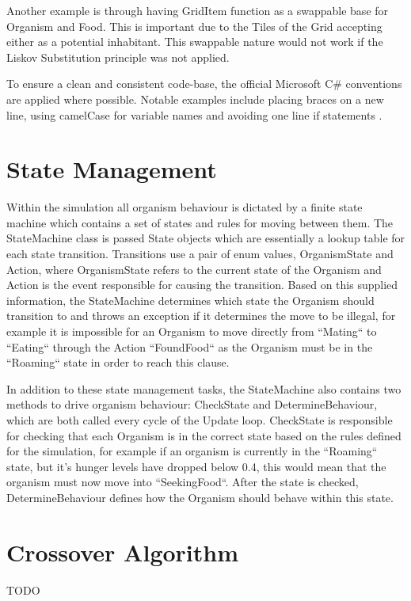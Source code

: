 \documentclass[a4paper, oneside, 11pt]{report}
\begin{document}
Another example is through having GridItem function as a swappable base for Organism and Food. This is important due to the Tiles of the Grid accepting either as a potential inhabitant. This swappable nature would not work if the Liskov Substitution principle was not applied.

To ensure a clean and consistent code-base, the official Microsoft C\# conventions are applied where possible. Notable examples include placing braces on a new line, using camelCase for variable names and avoiding one line if statements \cite{microsoft}.

\section{State Management}\label{statemanagement}
Within the simulation all organism behaviour is dictated by a finite state machine which contains a set of states and rules for moving between them. The StateMachine class is passed State objects which are essentially a lookup table for each state transition. Transitions use a pair of enum values, OrganismState and Action, where OrganismState refers to the current state of the Organism and Action is the event responsible for causing the transition. Based on this supplied information, the StateMachine determines which state the Organism should transition to and throws an exception if it determines the move to be illegal, for example it is impossible for an Organism to move directly from ``Mating`` to ``Eating`` through the Action ``FoundFood`` as the Organism must be in the ``Roaming`` state in order to reach this clause.

In addition to these state management tasks, the StateMachine also contains two methods to drive organism behaviour: CheckState and DetermineBehaviour, which are both called every cycle of the Update loop. CheckState is responsible for checking that each Organism is in the correct state based on the rules defined for the simulation, for example if an organism is currently in the ``Roaming`` state, but it's hunger levels have dropped below 0.4, this would mean that the organism must now move into ``SeekingFood``. After the state is checked, DetermineBehaviour defines how the Organism should behave within this state.

\section{Crossover Algorithm}\label{crossover}
TODO
\end{document}

